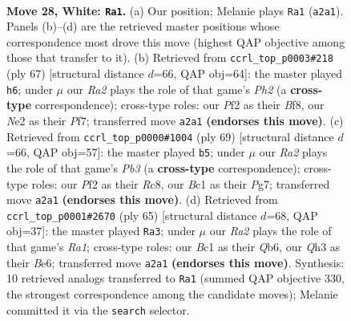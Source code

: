 \documentclass[11pt]{article}
\begin{document}
\clearpage

\begin{figure}[p]\centering
\begin{subfigure}{0.46\textwidth}\centering
\resizebox{\linewidth}{!}{%
\newchessgame
\chessboard[
  setfen={r2k4/b3n3/4p3/pp2q3/b1p5/P6Q/RP1NNPP1/2B1K3 w - - 1 28},
  showmover=false,
  pgfstyle=straightmove, color=movearrow, markmove={a2-a1}
]}
\caption{}
\end{subfigure}\hfill
\begin{subfigure}{0.46\textwidth}\centering
\resizebox{\linewidth}{!}{%
\newchessgame
\chessboard[
  setfen={5bk1/p4p1p/2q5/2p1r3/P1Q1n1P1/4B3/5PP1/3R1NK1 b - - 0 34},
  showmover=false,
  pgfstyle=straightmove, color=movearrow, markmove={h7-h6}
]}
\caption{}
\end{subfigure}
\\[4pt]
\begin{subfigure}{0.46\textwidth}\centering
\resizebox{\linewidth}{!}{%
\newchessgame
\chessboard[
  setfen={2r5/4qppk/1p3n1p/5P2/2b1p3/P6P/1B1Q1PPK/1BR5 b - - 1 35},
  showmover=false,
  pgfstyle=straightmove, color=movearrow, markmove={b6-b5}
]}
\caption{}
\end{subfigure}\hfill
\begin{subfigure}{0.46\textwidth}\centering
\resizebox{\linewidth}{!}{%
\newchessgame
\chessboard[
  setfen={r7/5pk1/1q2b2p/3p4/1pnP1BP1/1Q2P2P/6B1/1R4K1 b - - 2 33},
  showmover=false,
  pgfstyle=straightmove, color=movearrow, markmove={a8-a3}
]}
\caption{}
\end{subfigure}
\caption{\textbf{Move 28, White: \texttt{Ra1}.} (a) Our position; Melanie plays \texttt{Ra1} (\texttt{a2a1}). Panels (b)--(d) are the retrieved master positions whose correspondence most drove this move (highest QAP objective among those that transfer to it). (b) Retrieved from \texttt{ccrl\_top\_p0003\#218} (ply 67) [structural distance $d$=66, QAP obj=64]: the master played \texttt{h6}; under $\mu$ our \emph{Ra2} plays the role of that game's \emph{Ph2} (a \textbf{cross-type} correspondence); cross-type roles: our \emph{P}f2 as their \emph{B}f8, our \emph{N}e2 as their \emph{P}f7; transferred move \texttt{a2a1} \textbf{(endorses this move)}. (c) Retrieved from \texttt{ccrl\_top\_p0000\#1004} (ply 69) [structural distance $d$=66, QAP obj=57]: the master played \texttt{b5}; under $\mu$ our \emph{Ra2} plays the role of that game's \emph{Pb3} (a \textbf{cross-type} correspondence); cross-type roles: our \emph{P}f2 as their \emph{R}c8, our \emph{B}c1 as their \emph{P}g7; transferred move \texttt{a2a1} \textbf{(endorses this move)}. (d) Retrieved from \texttt{ccrl\_top\_p0001\#2670} (ply 65) [structural distance $d$=68, QAP obj=37]: the master played \texttt{Ra3}; under $\mu$ our \emph{Ra2} plays the role of that game's \emph{Ra1}; cross-type roles: our \emph{B}c1 as their \emph{Q}b6, our \emph{Q}h3 as their \emph{B}e6; transferred move \texttt{a2a1} \textbf{(endorses this move)}. Synthesis: 10 retrieved analogs transferred to \texttt{Ra1} (summed QAP objective 330, the strongest correspondence among the candidate moves); Melanie committed it via the \texttt{search} selector.}
\label{fig:thought-m54}
\end{figure}
\end{document}
